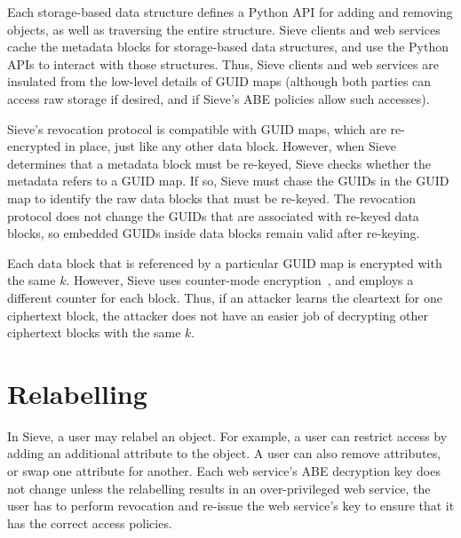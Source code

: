 Each storage-based data structure defines a
Python API for adding and removing objects,
as well as traversing the entire structure.
Sieve clients and web services cache the
metadata blocks for storage-based data
structures, and use the Python APIs to
interact with those structures. Thus, Sieve
clients and web services are insulated from
the low-level details of GUID maps (although
both parties can access raw storage if desired,
and if Sieve's ABE policies allow such accesses).

Sieve's revocation protocol
is compatible with GUID maps, which are re-encrypted
in place, just like any other data block. However,
when Sieve determines that a metadata block must
be re-keyed, Sieve checks whether the metadata
refers to a GUID map. If so, Sieve must chase
the GUIDs in the GUID map to identify the
raw data blocks that must be re-keyed. The revocation
protocol does not change the GUIDs that are
associated with re-keyed data blocks, so embedded
GUIDs inside data blocks remain valid after
re-keying.

Each data block that is referenced by
a particular GUID map is encrypted with the
same $k$. However, Sieve uses counter-mode
encryption~\cite{ctrmode}, and employs a
different counter for each block.
Thus, if an attacker learns the cleartext
for one ciphertext block, the attacker does
not have an easier job of decrypting other
ciphertext blocks with the same $k$.

\section{Relabelling}
\label{sec:relabel}

In Sieve, a user may relabel an object. For
example, a user can restrict access by adding
an additional attribute to the object. A user
can also remove attributes, or swap one
attribute for another. Each web service's 
ABE decryption key does not change unless 
the relabelling results in an over-privileged 
web service, the user has to perform 
revocation and re-issue the web service's 
key to ensure that it has the correct access
policies.

